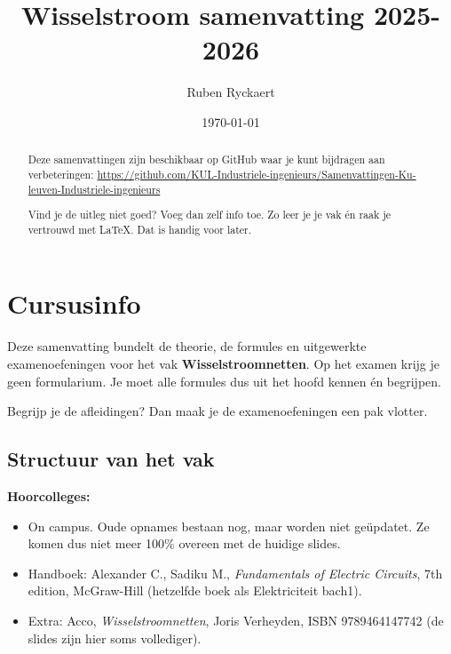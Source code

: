 \documentclass[a4paper,11pt]{article}
\title{Wisselstroom samenvatting 2025-2026}
\author{Ruben Ryckaert}
\date{\today}
\begin{document}
\maketitle
\begin{abstract}
    Deze samenvattingen zijn beschikbaar op GitHub waar je kunt bijdragen aan verbeteringen: \url{https://github.com/KUL-Industriele-ingenieurs/Samenvattingen-Ku-leuven-Industriele-ingenieurs}

    Vind je de uitleg niet goed? Voeg dan zelf info toe. Zo leer je je vak \'en raak je vertrouwd met LaTeX.
    Dat is handig voor later.
\end{abstract}

\tableofcontents
\printformularium
\newpage

\section*{Cursusinfo}

Deze samenvatting bundelt de theorie, de formules en uitgewerkte examenoefeningen voor het vak
\textbf{Wisselstroomnetten}. Op het examen krijg je geen formularium. Je moet alle formules dus
uit het hoofd kennen \'en begrijpen.

Begrijp je de afleidingen? Dan maak je de examenoefeningen een pak vlotter.

\subsection*{Structuur van het vak}

\textbf{Hoorcolleges:}
\begin{itemize}
    \item On campus. Oude opnames bestaan nog, maar worden niet geüpdatet. Ze komen dus niet
          meer 100\% overeen met de huidige slides.
    \item Handboek: Alexander C., Sadiku M., \textit{Fundamentals of Electric Circuits}, 7th edition,
          McGraw-Hill (hetzelfde boek als Elektriciteit bach1).
    \item Extra: Acco, \textit{Wisselstroomnetten}, Joris Verheyden, ISBN 9789464147742
          (de slides zijn hier soms vollediger).
\end{itemize}
\end{document}
